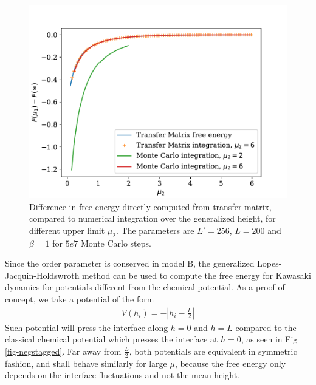 {\begin{figure}
    \centering
    \includegraphics[width=0.7\linewidth]{int-dyn/integration-free-ene.pdf}
    \caption{Difference in free energy directly computed from transfer matrix, compared to numerical integration over the generalized height, for different upper limit $\mu_2$. The parameters are $L' = 256$, $L=200$ and $\beta=1$ for $5e7$ Monte Carlo steps.}
    \label{integration-free-ene}
\end{figure}

Since the order parameter is conserved in model B, the generalized Lopes-Jacquin-Holdswroth method can be used to compute the free energy for Kawasaki dynamics for potentials different from the chemical potential. 
As a proof of concept, we take a potential of the form
\begin{align}
    V(h_i) = - |h_i-\frac{L}{2}|
    \label{neggstaged}
\end{align}
Such potential will press the interface along $h=0$ and $h=L$ compared to the classical chemical potential which presses the interface at $h=0$, as seen in Fig \ref{fig-negstagged}. Far away from $\frac{L}{2}$, both potentials are equivalent in symmetric fashion, and shall behave similarly for large $\mu$, because the free energy only depends on the interface fluctuations and not the mean height. 


}
